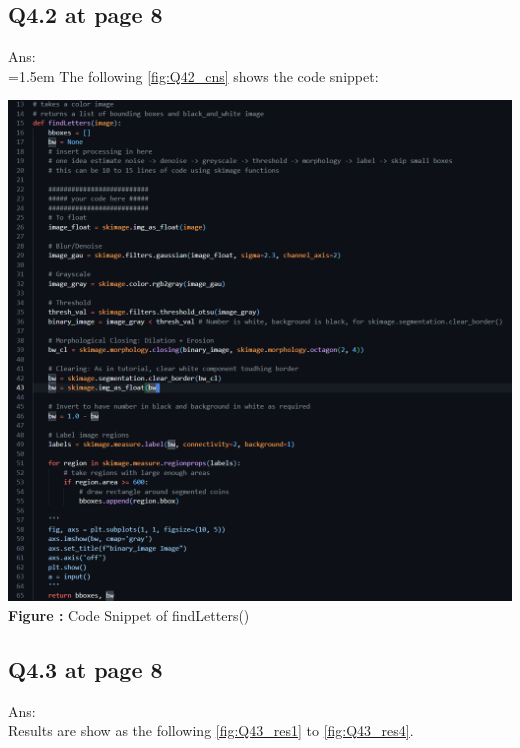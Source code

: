 \documentclass{article}
\begin{document}
	\newpage
	\subsection*{Q4.2 at page 8\texttt{}}
	Ans:\\
	\hangindent=1.5em \hspace{1.5em}  The following \autoref{fig:Q42_cns} shows the code snippet:
	\newline

	\begin{minipage}{1\linewidth}
	\centering
	\hspace{0.12\linewidth} 
	\includegraphics[width=0.7\linewidth]{./Q42_cns.png}  %
	\newline
	\textbf{Figure \thefigure:} Code Snippet of findLetters() %
	\label{fig:Q42_cns}  %
	\end{minipage}	


	\newpage
	\subsection*{Q4.3 at page 8}
	Ans:\\
	Results are show as the following \autoref{fig:Q43_res1} to \autoref{fig:Q43_res4}.
\end{document}
